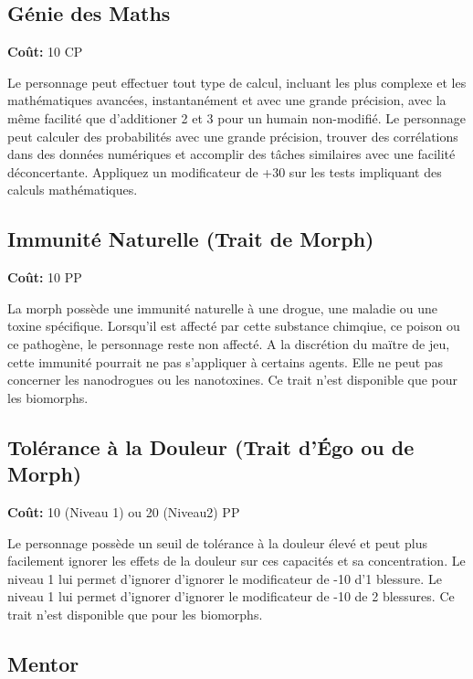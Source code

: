 \subsection{Génie des Maths} \label{sec:traits-mathwiz} \textbf{Coût:} 10 CP 

Le personnage peut effectuer tout type de calcul, incluant les plus complexe et les mathématiques avancées, instantanément et avec une grande précision, avec la même facilité que d'additioner 2 et 3 pour un humain non-modifié. Le personnage peut calculer des probabilités avec une grande précision, trouver des corrélations dans des données numériques et accomplir des tâches similaires avec une facilité déconcertante. Appliquez un modificateur de +30 sur les tests impliquant des calculs mathématiques. 

\subsection{Immunité Naturelle (Trait de Morph)} \label{sec:traits-natural-immunity} 

\textbf{Coût:} 10 PP 

La morph possède une immunité naturelle à une drogue, une maladie ou une toxine spécifique. Lorsqu'il est affecté par cette substance chimqiue, ce poison ou ce pathogène, le personnage reste non affecté. A la discrétion du maïtre de jeu, cette immunité pourrait ne pas s'appliquer à certains agents. Elle ne peut pas concerner les nanodrogues ou les nanotoxines. Ce trait n'est disponible que pour les biomorphs. 

\subsection{Tolérance à la Douleur (Trait d'Égo ou de Morph)} \label{sec:traits-pain-tolerance} 

\textbf{Coût:} 10 (Niveau 1) ou 20 (Niveau2) PP 

Le personnage possède un seuil de tolérance à la douleur élevé et peut plus facilement ignorer les effets de la douleur sur ces capacités et sa concentration. Le niveau 1 lui permet d'ignorer d'ignorer le modificateur de -10 d'1 blessure. Le niveau 1 lui permet d'ignorer d'ignorer le modificateur de -10 de 2 blessures. Ce trait n'est disponible que pour les biomorphs. 

\subsection{Mentor} \label{sec:traits-patron} 

